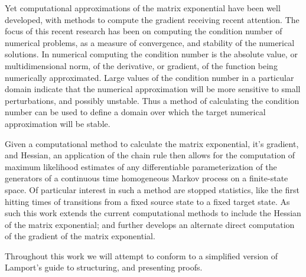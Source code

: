 Yet computational approximations of the matrix exponential have been well developed, with
methods to compute the gradient receiving recent attention. The focus of this recent
research has been on computing the condition number of numerical problems, as a measure of 
convergence, and stability of the numerical solutions\cite{al-mohy_computing_2009}. In
numerical computing the condition number is the absolute value, or multidimensional norm, 
of the derivative, or gradient, of the function being numerically approximated. Large values
of the condition number in a particular domain indicate that the numerical approximation 
will be more sensitive to small perturbations, and possibly unstable. Thus a method of
calculating the condition number can be used to define a domain over which the target 
numerical approximation will be stable.

Given a computational method to calculate the matrix exponential, it's gradient, and
Hessian, an application of the chain rule then allows for the computation of maximum
likelihood estimates of any differentiable parameterization of the generators of a
continuous time homogeneous Markov process on a finite-state space. Of particular interest
in such a method are stopped statistics, like the first hitting times of transitions from a
fixed source state to a fixed target state. As such this work extends the current
computational methods to include the Hessian of the matrix exponential; and further develops
an alternate direct computation of the gradient of the matrix exponential.

Throughout this work we will attempt to conform to a simplified version of Lamport's guide
to structuring, and presenting proofs\cite{lamport_how_2012}.
